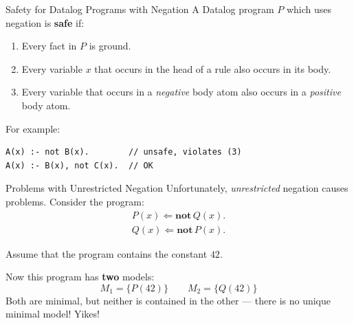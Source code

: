 \begin{frame}[fragile]{Safety for Datalog Programs with Negation}
A Datalog program $P$ which uses negation is \textbf{safe} if:
\begin{enumerate}
    \item Every fact in $P$ is ground.
    \item Every variable $x$ that occurs in the head of a rule also occurs in
    its body.
    \item Every variable that occurs in a \emph{negative} body atom also occurs
    in a \emph{positive} body atom.
\end{enumerate}

\pause

For example:
\begin{lstlisting}[language=flix,xleftmargin=0.8cm]
A(x) :- not B(x).        // unsafe, violates (3)
A(x) :- B(x), not C(x).  // OK
\end{lstlisting}
\end{frame}

\begin{frame}{Problems with Unrestricted Negation}
Unfortunately, \emph{unrestricted} negation causes problems. Consider the program:
%
\begin{align*}
P(x) \Leftarrow \textbf{not} \, Q(x). \\ 
Q(x) \Leftarrow \textbf{not} \, P(x).
\end{align*}

\pause

Assume that the program contains the constant $42$. 

Now this program has \textbf{two} models:
%
$$
    M_1 = \{ P(42) \} \qquad M_2 = \{ Q(42) \}
$$
%
Both are minimal, but neither is contained in the other --- there is no
unique minimal model! Yikes!
\end{frame}

